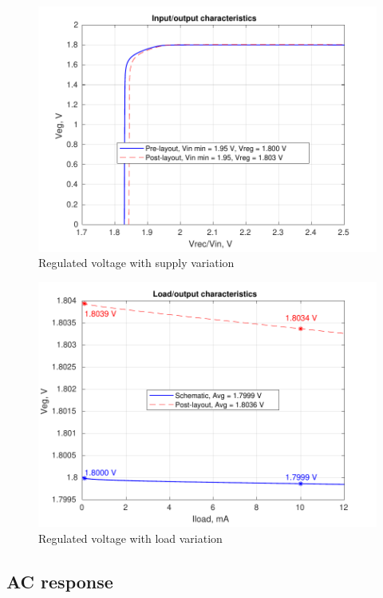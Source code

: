\documentclass[12pt,a4paper,UKenglish]{report}
\begin{document}
\begin{figure}[!htb] %
   \centering
   \includegraphics[width=1\textwidth]{img/ldo_dc_both.pdf} 
   \caption{Regulated voltage with supply variation}
   \label{fig:ldo_dc}
\end{figure}

\begin{figure}[!htb] %
   \centering
   \includegraphics[width=1\textwidth]{img/ldo_Iload_both.pdf} 
   \caption{Regulated voltage with load variation}
   \label{fig:ldo_Iload}
\end{figure}

\subsection{AC response}		%
\end{document}
